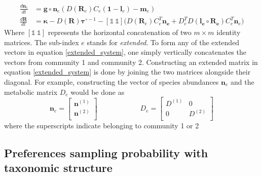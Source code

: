 \documentclass[12pt]{article}
\begin{document}
            \begin{equation}\label{extended_system}
        		\begin{aligned}
        		\frac{d\boldsymbol{n}_e}{dt} &= \boldsymbol{g}\circ \boldsymbol{n}_{e}\left(D(\boldsymbol{R}_e)C_{e}(\boldsymbol{1}-\boldsymbol{l}_e) - \boldsymbol{m}_e\right)\\
        		\frac{d\boldsymbol{R}}{dt} &= \boldsymbol{\kappa} - D(\boldsymbol{R})\boldsymbol{\tau}^{\circ -1}- \left[\mathbb{1} \ \mathbb{1}\right] \Big( D(\boldsymbol{R}_e)C_e^T\boldsymbol{n_e} +  D_e^TD(\boldsymbol{l_e}\circ \boldsymbol{R_e})C_e^T\boldsymbol{n}_e\Big)
        		\end{aligned}
        	\end{equation}
        	Where $ \left[\mathbb{1} \ \mathbb{1}\right] $ represents the horizontal concatenation of two $m \times m$ identity matrices. The sub-index $e$ stands for \textit{extended}. To form any of the extended vectors in equation \ref{extended_system}, one simply vertically concatenates the vectors from community 1 and community 2. Constructing an extended matrix in equation \ref{extended_system} is done by joining the two matrices alongside their diagonal. For example, constructing the vector of species abundances $\boldsymbol{n}_e$ and the metabolic matrix $D_e$ would be done as
        	\begin{equation}
        	    \boldsymbol{n}_e = \begin{bmatrix}
                                        \boldsymbol{n}^{(1)} \\
                                        \boldsymbol{n}^{(2)} \\
                                    \end{bmatrix} 
                \qquad \qquad \qquad 
                D_e = \begin{bmatrix}
                            D^{(1)} & 0 \\
                            0 & D^{(2)} \\ 
                      \end{bmatrix}
        	\end{equation}
        	where the superscripts indicate belonging to community 1 or 2
        	
	    \subsection{Preferences sampling probability with taxonomic structure}\label{derivations}
	    
\end{document}
